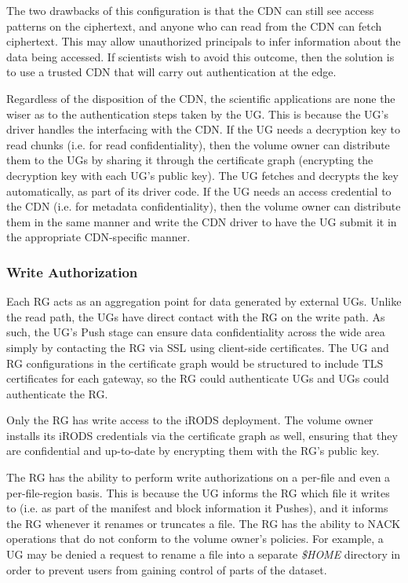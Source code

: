 The two drawbacks of this configuration is that the CDN can still see access patterns
on the ciphertext, and anyone who can read from the CDN can fetch ciphertext.
This may allow unauthorized principals to infer information about the data being
accessed.  If scientists wish to avoid this outcome, then the solution is to use
a trusted CDN that will carry out authentication at the edge.

Regardless of the disposition of the CDN, the scientific applications are none
the wiser as to the authentication steps taken by the UG.  This is
because the UG's driver handles the interfacing with the CDN.  If the
UG needs a decryption key to read chunks (i.e. for read confidentiality), then
the volume owner can distribute them to the UGs by sharing it through the
certificate graph (encrypting the decryption key with each UG's public key).
The UG fetches and decrypts the key automatically, as part of its driver code.  If
the UG needs an access credential to the CDN (i.e. for metadata
confidentiality), then the volume owner can distribute them in the same manner
and write the CDN driver to have the UG submit it in the appropriate
CDN-specific manner.

\subsubsection{Write Authorization}

Each RG acts as an aggregation point for data generated by external UGs.
Unlike the read path, the UGs have direct contact with the RG on the write path.
As such, the UG's Push stage can ensure data confidentiality across the wide
area simply by contacting the RG via SSL using client-side certificates.  The UG and RG configurations in the
certificate graph would be structured to include TLS certificates for each
gateway, so the RG could authenticate UGs and UGs could authenticate the RG.

Only the RG has write access to the iRODS deployment.  The volume owner installs its
iRODS credentials via the certificate graph as well, ensuring that they are
confidential and up-to-date by encrypting them with the RG's public key.

The RG has the ability to perform write authorizations on a per-file and even a
per-file-region basis.  This is because the UG informs the RG which file it
writes to (i.e. as part of the manifest and block information it Pushes), and it
informs the RG whenever it renames or truncates a file.  The RG has the ability
to NACK operations that do not conform to the volume owner's policies.  For
example, a UG may be denied a request to rename a file into a separate
\textit{\$HOME} directory in order to prevent users from gaining control of
parts of the dataset.

